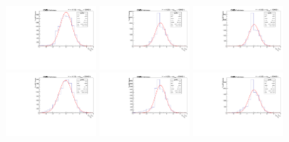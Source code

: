 \begin{figure}[!htbp]
\begin{center}
\includegraphics[width=0.3\textwidth]{figures/modeling_xchecks/plots/HToUpsilon1SPhoton_Cat0_signalStrenght_100000/pulls}
\includegraphics[width=0.3\textwidth]{figures/modeling_xchecks/plots/HToUpsilon2SPhoton_Cat0_signalStrenght_100000/pulls}
\includegraphics[width=0.3\textwidth]{figures/modeling_xchecks/plots/HToUpsilon3SPhoton_Cat0_signalStrenght_100000/pulls}
\includegraphics[width=0.3\textwidth]{figures/modeling_xchecks/plots/HToUpsilon1SPhoton_Cat0_signalStrenght_200000/pulls}
\includegraphics[width=0.3\textwidth]{figures/modeling_xchecks/plots/HToUpsilon2SPhoton_Cat0_signalStrenght_200000/pulls}
\includegraphics[width=0.3\textwidth]{figures/modeling_xchecks/plots/HToUpsilon3SPhoton_Cat0_signalStrenght_200000/pulls}

\end{center}
\end{figure}
